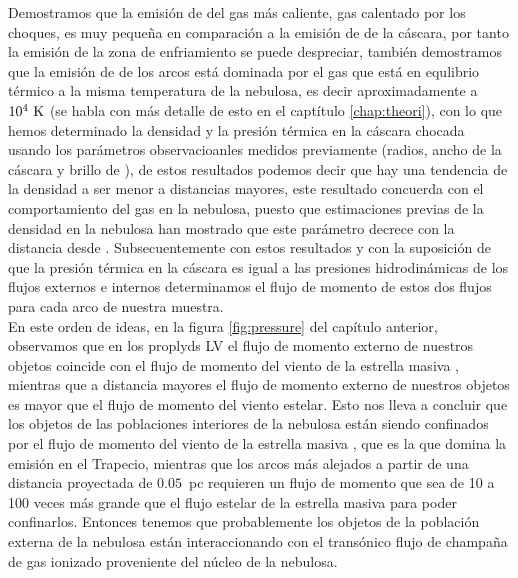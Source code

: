 Demostramos que la emisión de \ha{} del gas más caliente, gas calentado por los choques, es muy pequeña en comparación a la emisión de \ha{} de la cáscara, por tanto la emisión de la zona de enfriamiento se puede despreciar, también demostramos que la emisión de \ha{} de los arcos está dominada por el gas que está en equlibrio térmico a la misma temperatura de la nebulosa, es decir aproximadamente a \(10^{4}~\mathrm{K}\) (se habla con más detalle de esto en el captítulo \ref{chap:theori}), con lo que hemos determinado la densidad y la presión térmica en la cáscara chocada usando los parámetros observacioanles medidos previamente (radios, ancho de la cáscara y brillo de \ha{}), de estos resultados podemos decir que hay una tendencia de la densidad a ser menor a distancias mayores, este resultado concuerda con el comportamiento del gas en la nebulosa, puesto que estimaciones previas de la densidad en la nebulosa han mostrado que este parámetro decrece con la  distancia desde \thC{} \citep{Odell:2010, Mesa:2008}. Subsecuentemente con estos resultados y con la suposición de que la presión térmica en la cáscara es igual a las presiones hidrodinámicas de los flujos externos e internos determinamos el flujo de momento de estos dos flujos para cada arco de nuestra muestra.\\
  
En este orden de ideas, en la figura \ref{fig:pressure} del capítulo anterior, observamos que en los proplyds LV el flujo de momento externo de nuestros objetos coincide con el flujo de momento del viento de la estrella masiva \thC{}, mientras que a distancia mayores el flujo de momento externo de nuestros objetos es mayor que el flujo de momento del viento estelar. Esto nos lleva a concluir que los objetos de las poblaciones interiores de la nebulosa están siendo confinados por el flujo de momento del viento de la estrella masiva \thC{}, que es la que domina la emisión en el Trapecio, mientras que los arcos más alejados a partir de una distancia proyectada de \(0.05\)~pc requieren un flujo de momento que sea de 10 a 100 veces más grande que el flujo estelar de la estrella masiva para poder confinarlos. Entonces tenemos que probablemente los objetos de la población externa de la nebulosa están interaccionando con el transónico flujo de champaña de gas ionizado proveniente del núcleo de la nebulosa.\\ 

